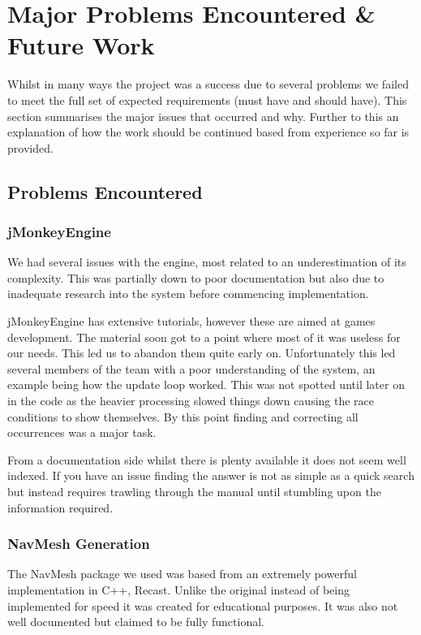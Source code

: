 

\section{Major Problems Encountered \& Future Work}

Whilst in many ways the project was a success due to several problems
we failed to meet the full set of expected requirements (must have
and should have). This section summarises the major issues that occurred
and why. Further to this an explanation of how the work should be
continued based from experience so far is provided.


\subsection{Problems Encountered}
\label{Problems:subsec:problemsecountered}

\subsubsection{jMonkeyEngine}

We had several issues with the engine, most related to an underestimation
of its complexity. This was partially down to poor documentation but
also due to inadequate research into the system before commencing
implementation.

jMonkeyEngine has extensive tutorials, however these are aimed at games
development. The material soon got to a point where most of it was
useless for our needs. This led us to abandon them quite early on.
Unfortunately this led several members of the team with a poor understanding
of the system, an example being how the update loop worked. This was
not spotted until later on in the code as the heavier processing slowed
things down causing the race conditions to show themselves. By this
point finding and correcting all occurrences was a major task.

From a documentation side whilst there is plenty available it does
not seem well indexed. If you have an issue finding the answer is
not as simple as a quick search but instead requires trawling through
the manual until stumbling upon the information required.


\subsubsection*{NavMesh Generation}
\label{Problems:subsubsec:navmesh}
The NavMesh package we used was based from an extremely powerful implementation
in C++, Recast. Unlike the original instead of being implemented for
speed it was created for educational purposes. It was also not well
documented but claimed to be fully functional.

